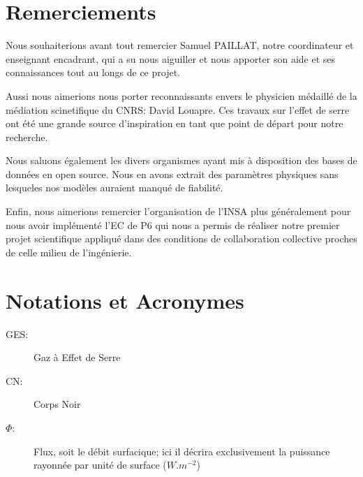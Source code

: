 \documentclass[a4paper, 12pt]{report} %
\begin{document}

\newpage
\chapter*{Remerciements} %

\setlength{\parindent}{30pt}
Nous souhaiterions avant tout remercier Samuel PAILLAT, notre
coordinateur et enseignant encadrant, qui a su nous aiguiller
et nous apporter son aide et ses connaissances tout au longs
de ce projet. \vspace{\baselineskip}

\indent Aussi nous aimerions nous porter reconnaissants 
envers le physicien médaillé de la médiation scinetifique
du CNRS: David Louapre. Ces travaux sur l'effet de serre 
ont été une grande source d'inspiration en tant que point 
de départ pour notre recherche. \vspace{\baselineskip}

\indent Nous saluons également les divers organismes ayant 
mis à disposition des bases de données en open source. Nous
en avons extrait des paramètres physiques sans lesqueles 
nos modèles auraient manqué de fiabilité. \vspace{\baselineskip}

\indent Enfin, nous aimerions remercier l'organisation de 
l'INSA plus généralement pour nous avoir implémenté l'EC de P6
qui nous a permis de réaliser notre premier projet
scientifique appliqué dans des conditions de collaboration
collective proches de celle milieu de l'ingénierie. 
\vfill



\newpage
\pagestyle{courant} 
	\setcounter{tocdepth}{2} %
	\tableofcontents %


\newpage
\chapter*{Notations et Acronymes} 

\begin{description}
	\item[GES:] Gaz à Effet de Serre
    \item[CN:] Corps Noir
    
    \item[$\Phi$:] Flux, soit le débit surfacique; ici il décrira exclusivement 
	la puissance rayonnée par unité de surface ($W.m^{-2}$)
\end{description}
\end{document}
